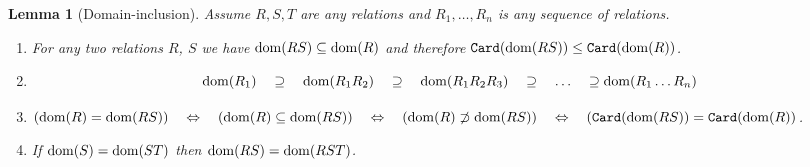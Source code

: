 \documentclass{lmcs}
\newtheorem{lemma}[theorem]{Lemma}
\begin{document}
\begin{lemma}[Domain-inclusion]
\label{lemma-domain-inclusion}
Assume $R, S, T$ are any relations and $R_1, \ldots, R_n$ is any sequence of relations.
\begin{enumerate}

\item
\label{lemma-domain-inclusion-01}
For any two relations $R$, $S$ we have ${\rm dom}(RS) \subseteq {\rm dom}(R)$
and therefore ${\tt Card}({\rm dom}(RS)) \le {\tt Card}({\rm dom}(R))$.

\item
\label{lemma-domain-inclusion-02}

$$
\dom(R_1)   \ \ \  \supseteq  \ \ \ 
\dom(R_1 R_2)    \ \ \  \supseteq  \ \ \ 
\dom(R_1 R_2 R_3)    \ \ \  \supseteq  \ \ \  
\ldots   \ \ \  \supseteq
\dom(R_1 \ldots R_n)
$$

\item
\label{lemma-domain-inclusion-03}
$
(\dom(R) = \dom(RS))  
\ \ \  \Leftrightarrow \ \ \ 
(\dom(R) \subseteq \dom(RS)) 
\ \ \  \Leftrightarrow \ \ \  
(\dom(R) \not \supset  \dom(RS))
\ \ \  \Leftrightarrow \ \ \ 
(\Card(\dom(RS)) = \Card(\dom(R))
$.

\item
\label{lemma-domain-inclusion-04}
If ${\rm dom}(S) = {\rm dom}(ST)$ then 
${\rm dom}(RS) = {\rm dom}(RST)$.

\end{enumerate}
\end{lemma}
\end{document}
